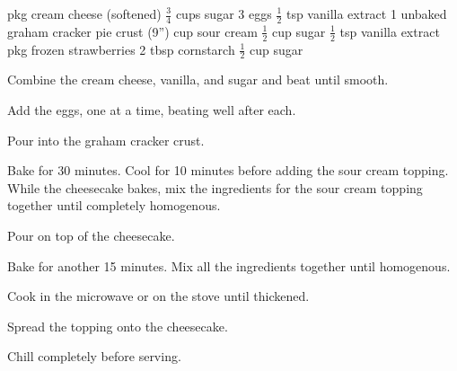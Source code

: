 \dishtype{\dessert}
\dishother{\vegetarian}
\begin{ingreds}
     pkg cream cheese (softened)
        $\frac{3}{4}$ cups sugar
        3 eggs
        $\frac{1}{2}$ tsp vanilla extract
        1 unbaked graham cracker pie crust (9'')
    \columnbreak{}
     cup sour cream
        $\frac{1}{2}$ cup sugar
        $\frac{1}{2}$ tsp vanilla extract
     pkg frozen strawberries
        2 tbsp cornstarch
        $\frac{1}{2}$ cup sugar
\end{ingreds}
\begin{method}
        Combine the cream cheese, vanilla, and sugar and beat until smooth.\par
        Add the eggs, one at a time, beating well after each.\par
        Pour into the graham cracker crust.\par
        Bake for 30 minutes. Cool for 10 minutes before adding the sour cream topping.
        While the cheesecake bakes, mix the ingredients for the sour cream topping together until completely homogenous.\par
        Pour on top of the cheesecake.\par
        Bake for another 15 minutes.
        Mix all the ingredients together until homogenous.\par
        Cook in the microwave or on the stove until thickened.\par
        Spread the topping onto the cheesecake.\par
        Chill completely before serving.
\end{method}